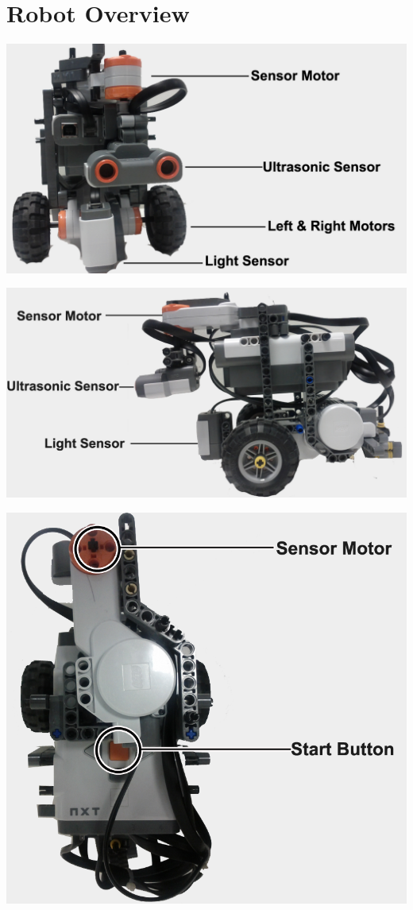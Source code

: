 \documentclass[11pt, a4paper]{report}
\begin{document}
\section{Robot Overview}
\vskip 20pt
\begin{center}
\includegraphics[scale=0.388]{./image/robot1.png}
\end{center}
\vskip 20pt
\begin{center}
\includegraphics[scale=0.37]{./image/robot2.png}
\end{center}

\begin{center}
\includegraphics[scale=0.4]{./image/robot3.png}
\end{center}
\end{document}
